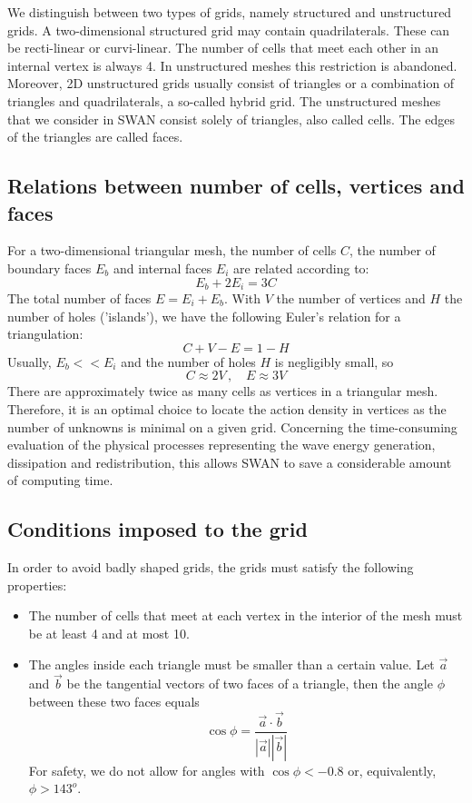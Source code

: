 \documentclass[12pt]{book}
\begin{document}
We distinguish between two types of grids, namely structured and unstructured grids. A two-dimensional structured grid may contain quadrilaterals. These
can be recti-linear or curvi-linear. The number
of cells that meet each other in an internal vertex is always 4. In unstructured meshes this restriction is abandoned. Moreover, 2D unstructured grids usually
consist of triangles or a combination of triangles and quadrilaterals, a so-called hybrid grid. The unstructured meshes that we consider in SWAN consist solely
of triangles, also called cells. The edges of the triangles are called faces.

\subsection{Relations between number of cells, vertices and faces}

For a two-dimensional triangular mesh, the number of cells $C$, the number of boundary faces $E_b$ and internal faces $E_i$ are related according to:
\begin{equation}
  E_b + 2 E_i = 3C
\end{equation}
The total number of faces $E = E_i + E_b$. With $V$ the number of vertices and $H$ the number of holes ('islands'), we have the following Euler's relation
for a triangulation:
\begin{equation}
  C + V  - E = 1 - H
\end{equation}
Usually, $E_b << E_i$ and the number of holes $H$ is negligibly small, so
\begin{equation}
  C \approx 2V\, , \quad E \approx 3V
\end{equation}
There are approximately twice as many cells as vertices
in a triangular mesh.
Therefore, it is an optimal choice to locate the action density in vertices
as the number of unknowns is minimal on a given grid.
Concerning the
time-consuming evaluation of the physical processes representing the wave energy generation,
dissipation and redistribution, this allows SWAN to save a considerable amount of computing time.

\subsection{Conditions imposed to the grid}

In order to avoid badly shaped grids, the grids must satisfy the following
properties:
\begin{itemize}
  \item The number of cells that meet at each vertex in the interior of the mesh must be at least 4 and at most 10.
  \item The angles inside each triangle must be smaller than a certain value. Let $\vec{a}$ and $\vec{b}$ be the tangential vectors of two faces of a
        triangle, then the angle $\phi$ between these two faces equals
        \begin{equation}
           \cos \phi = \frac{\vec{a} \cdot \vec{b}}{|\vec{a}||\vec{b}|}
        \end{equation}
        For safety, we do not allow for angles with $\cos \phi < -0.8$ or, equivalently, $\phi > 143^o$.
\end{itemize}
\end{document}
